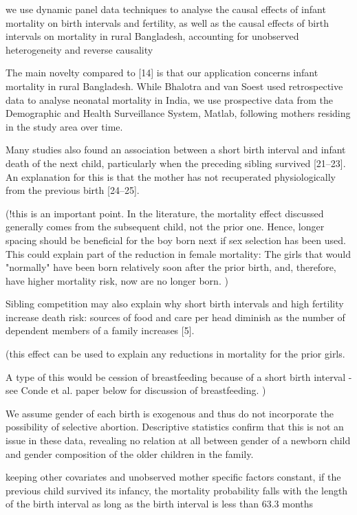\citet{Soest2018}

we use dynamic panel data techniques to analyse the causal effects of infant mortality on birth intervals and fertility, as well as the causal effects of birth intervals on mortality in rural Bangladesh, accounting for unobserved heterogeneity and reverse causality


The main novelty compared to [14] is that our application concerns
infant mortality in rural Bangladesh. While Bhalotra and van Soest used
retrospective data to analyse neonatal mortality in India, we use
prospective data from the Demographic and Health Surveillance System,
Matlab, following mothers residing in the study area over time.


Many studies also found an association between a short birth interval
and infant death of the next child, particularly when the preceding
sibling survived [21–23]. An explanation for this is that the mother has
not recuperated physiologically from the previous birth [24–25].

(!this is an important point. In the literature, the mortality effect discussed
generally comes from the subsequent child, not the prior one. 
Hence, longer spacing should be beneficial for the boy born next if 
sex selection has been used.
This could explain part of the reduction in female mortality: The
girls that would "normally" have been born relatively soon after the
prior birth, and, therefore, have higher mortality risk, now are no
longer born.
)

Sibling competition may also explain why short birth intervals and high
fertility increase death risk: sources of food and care per head
diminish as the number of dependent members of a family increases [5].

(this effect can be used to explain any reductions in mortality for
the prior girls.

A type of this would be cession of breastfeeding because of a short
birth interval - see Conde et al. paper below for discussion of 
breastfeeding. 
)

We assume gender of each birth is exogenous and thus do not incorporate
the possibility of selective abortion. Descriptive statistics confirm
that this is not an issue in these data, revealing no relation at all
between gender of a newborn child and gender composition of the older
children in the family.


keeping other covariates and unobserved mother specific factors
constant, if the previous child survived its infancy, the mortality
probability falls with the length of the birth interval as long as the
birth interval is less than 63.3 months

